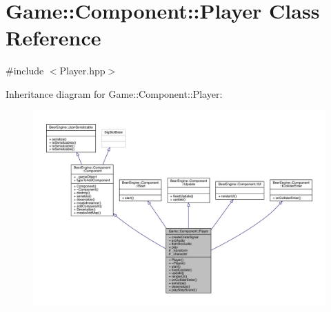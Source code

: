 \hypertarget{class_game_1_1_component_1_1_player}{}\section{Game\+:\+:Component\+:\+:Player Class Reference}
\label{class_game_1_1_component_1_1_player}


{\ttfamily \#include $<$Player.\+hpp$>$}



Inheritance diagram for Game\+:\+:Component\+:\+:Player\+:\nopagebreak
\begin{figure}[H]
\begin{center}
\leavevmode
\includegraphics[width=350pt]{class_game_1_1_component_1_1_player__inherit__graph}
\end{center}
\end{figure}



